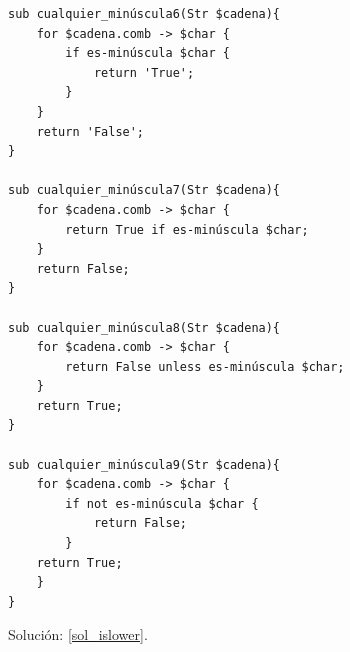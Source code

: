 \begin{exercise}
\begin{lstlisting}
sub cualquier_minúscula6(Str $cadena){
    for $cadena.comb -> $char {
        if es-minúscula $char {
            return 'True';
        }
    }
    return 'False';
}

sub cualquier_minúscula7(Str $cadena){
    for $cadena.comb -> $char {
        return True if es-minúscula $char;
    }
    return False;
}

sub cualquier_minúscula8(Str $cadena){
    for $cadena.comb -> $char {
        return False unless es-minúscula $char;
    }
    return True;
}

sub cualquier_minúscula9(Str $cadena){
    for $cadena.comb -> $char {
        if not es-minúscula $char {
            return False;
        }
    return True;
    }
}
\end{lstlisting}

Solución: \ref{sol_islower}.

\end{exercise}


